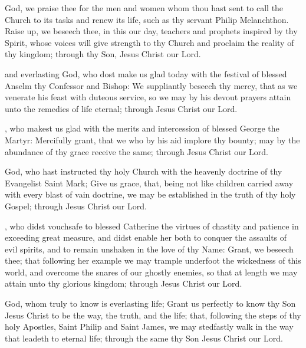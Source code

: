  God, we praise thee for the men and women whom thou hast sent to call the Church to its tasks and renew its life, such as thy servant Philip Melanchthon. Raise up, we beseech thee, in this our day, teachers and prophets inspired by thy Spirit, whose voices will give strength to thy Church and proclaim the reality of thy kingdom; through thy Son, Jesus Christ our Lord.

 and everlasting God, who dost make us glad today with the festival of blessed Anselm thy Confessor and Bishop: We suppliantly beseech thy mercy, that as we venerate his feast with duteous service, so we may by his devout prayers attain unto the remedies of life eternal; through Jesus Christ our Lord.

, who makest us glad with the merits and intercession of blessed George the Martyr: Mercifully grant, that we who by his aid implore thy bounty; may by the abundance of thy grace receive the same; through Jesus Christ our Lord.

 God, who hast instructed thy holy Church with the heavenly doctrine of thy Evangelist Saint Mark; Give us grace, that, being not like children carried away with every blast of vain doctrine, we may be established in the truth of thy holy Gospel; through Jesus Christ our Lord.

, who didst vouchsafe to blessed Catherine the virtues of chastity and patience in exceeding great measure, and didst enable her both to conquer the assaults of evil spirits, and to remain unshaken in the love of thy Name: Grant, we beseech thee; that following her example we may trample underfoot the wickedness of this world, and overcome the snares of our ghostly enemies, so that at length we may attain unto thy glorious kingdom; through Jesus Christ our Lord.

 God, whom truly to know is everlasting life; Grant us perfectly to know thy Son Jesus Christ to be the way, the truth, and the life; that, following the steps of thy holy Apostles, Saint Philip and Saint James, we may stedfastly walk in the way that leadeth to eternal life; through the same thy Son Jesus Christ our Lord.

